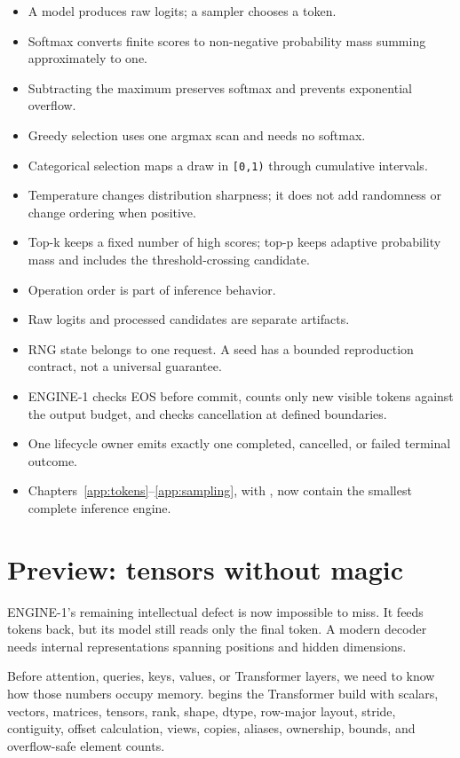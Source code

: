 \begin{itemize}
\tightlist
\item
  A model produces raw logits; a sampler chooses a token.
\item
  Softmax converts finite scores to non-negative probability mass
  summing approximately to one.
\item
  Subtracting the maximum preserves softmax and prevents exponential
  overflow.
\item
  Greedy selection uses one argmax scan and needs no softmax.
\item
  Categorical selection maps a draw in \texttt{{[}0,1)} through
  cumulative intervals.
\item
  Temperature changes distribution sharpness; it does not add randomness
  or change ordering when positive.
\item
  Top-k keeps a fixed number of high scores; top-p keeps adaptive
  probability mass and includes the threshold-crossing candidate.
\item
  Operation order is part of inference behavior.
\item
  Raw logits and processed candidates are separate artifacts.
\item
  RNG state belongs to one request. A seed has a bounded reproduction
  contract, not a universal guarantee.
\item
  ENGINE-1 checks EOS before commit, counts only new visible tokens
  against the output budget, and checks cancellation at defined
  boundaries.
\item
  One lifecycle owner emits exactly one completed, cancelled, or failed
  terminal outcome.
\item
  Chapters~\ref{app:tokens}--\ref{app:sampling}, with , now contain the smallest
  complete inference engine.
\end{itemize}

\section{Preview: tensors without
magic}\label{part-ii-preview-tensors-without-magic}

ENGINE-1's remaining intellectual defect is now impossible to miss. It
feeds tokens back, but its model still reads only the final token. A
modern decoder needs internal representations spanning positions and
hidden dimensions.

Before attention, queries, keys, values, or Transformer layers, we need
to know how those numbers occupy memory.  begins the Transformer build with
scalars, vectors, matrices, tensors, rank, shape, dtype, row-major
layout, stride, contiguity, offset calculation, views, copies, aliases,
ownership, bounds, and overflow-safe element counts.

